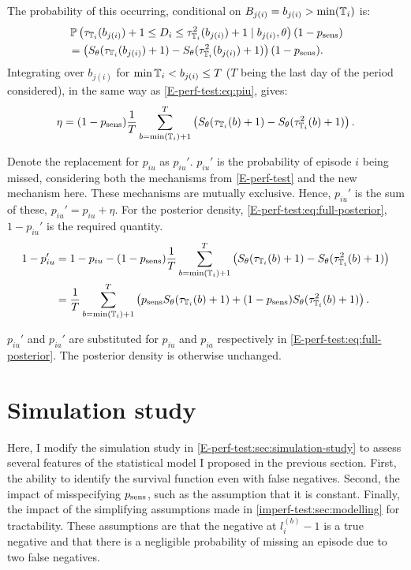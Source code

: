 \documentclass[thesis.tex]{subfiles}
\begin{document}
The probability of this occurring, conditional on $B_{j(i)} = b_{j(i)} > \min(\mathbb{T}_i)$ is:
\begin{align}
&\operatorname{\mathbb{P}} \left(
    \tau_{\mathbb{T}_i}(b_{j(i)}) + 1 \leq D_i \leq \tau^2_{\mathbb{T}_i}(b_{j(i)}) + 1
    \mid b_{j(i)},
\theta \right) (1 - p_\text{sens}) \\
&= \left( S_\theta(\tau_{\mathbb{T}_i}(b_{j(i)}) + 1) - S_\theta(\tau^2_{\mathbb{T}_i}(b_{j(i)}) + 1) \right) (1 - p_\text{sens}).
\end{align}
Integrating over $b_{j(i)}$ for $\min \mathbb{T}_i < b_{j(i)} \leq T$ ($T$ being the last day of the period considered), in the same way as \cref{E-perf-test:eq:piu}, gives:
\begin{align}
\eta = (1 - p_\text{sens})\frac{1}{T} \sum_{b=\min(\mathbb{T}_i) + 1}^T \left( S_\theta(\tau_{\mathbb{T}_i}(b) + 1) - S_\theta(\tau^2_{\mathbb{T}_i}(b) + 1) \right).
\end{align}

Denote the replacement for $p_{iu}$ as $p_{iu}'$.
$p_{iu}'$ is the probability of episode $i$ being missed, considering both the mechanisms from \cref{E-perf-test} and the new mechanism here.
These mechanisms are mutually exclusive.
Hence, $p_{iu}'$ is the sum of these, $p_{iu}' = p_{iu} + \eta$.
For the posterior density, \cref{E-perf-test:eq:full-posterior}, $1 - p_{iu}'$ is the required quantity.
\begin{align}
1 - p_{iu}'
&= 1 - p_{iu} - (1 - p_\text{sens})\frac{1}{T} \sum_{b=\min(\mathbb{T}_i) + 1}^T \left( S_\theta(\tau_{\mathbb{T}_i}(b) + 1) - S_\theta(\tau^2_{\mathbb{T}_i}(b) + 1) \right) \\
&= \frac{1}{T} \sum_{b=\min(\mathbb{T}_i) + 1}^T \left( p_\text{sens} S_\theta(\tau_{\mathbb{T}_i}(b) + 1) + (1 - p_\text{sens}) S_\theta(\tau^2_{\mathbb{T}_i}(b) + 1)\right).
\label{imperf-test:eq:pit-prime}
\end{align}

$p_{iu}'$ and $p_{ia}'$ are substituted for $p_{iu}$ and $p_{ia}$ respectively in \cref{E-perf-test:eq:full-posterior}.
The posterior density is otherwise unchanged.

\section{Simulation study} \label{imperf-test:sec:sim-study-results}

Here, I modify the simulation study in \cref{E-perf-test:sec:simulation-study} to assess several features of the statistical model I proposed in the previous section.
First, the ability to identify the survival function even with false negatives.
Second, the impact of misspecifying $p_\text{sens}$, such as the assumption that it is constant.
Finally, the impact of the simplifying assumptions made in \cref{imperf-test:sec:modelling} for tractability.
These assumptions are that the negative at $l^{(b)}_i - 1$ is a true negative and that there is a negligible probability of missing an episode due to two false negatives.
\end{document}
